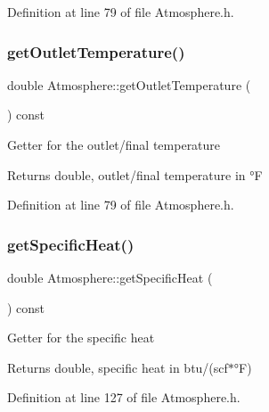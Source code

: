 Definition at line 79 of file Atmosphere.\+h.

\mbox{\label{class_atmosphere_a717e2dc78ebd13420f8f26707374dd3f}} 
\subsubsection{\texorpdfstring{get\+Outlet\+Temperature()}{getOutletTemperature()}\hspace{0.1cm}{\footnotesize\ttfamily [3/3]}}
{\footnotesize\ttfamily double Atmosphere\+::get\+Outlet\+Temperature (\begin{DoxyParamCaption}{ }\end{DoxyParamCaption}) const\hspace{0.3cm}{\ttfamily [inline]}}

Getter for the outlet/final temperature \begin{DoxyReturn}{Returns}
double, outlet/final temperature in °F 
\end{DoxyReturn}


Definition at line 79 of file Atmosphere.\+h.

\mbox{\label{class_atmosphere_a59802a10861a58ab0f0f4e0ab8671e14}} 
\subsubsection{\texorpdfstring{get\+Specific\+Heat()}{getSpecificHeat()}\hspace{0.1cm}{\footnotesize\ttfamily [1/3]}}
{\footnotesize\ttfamily double Atmosphere\+::get\+Specific\+Heat (\begin{DoxyParamCaption}{ }\end{DoxyParamCaption}) const\hspace{0.3cm}{\ttfamily [inline]}}

Getter for the specific heat \begin{DoxyReturn}{Returns}
double, specific heat in btu/(scf$\ast$°F) 
\end{DoxyReturn}


Definition at line 127 of file Atmosphere.\+h.

